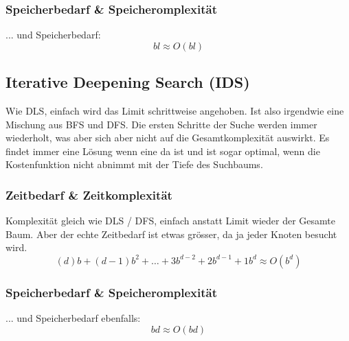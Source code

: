 \subsubsection{Speicherbedarf \& Speicheromplexität}
... und Speicherbedarf:
\begin{displaymath}
bl \approx O(bl)
\end{displaymath}

\subsection{Iterative Deepening Search (IDS)}
Wie DLS, einfach wird das Limit schrittweise angehoben. Ist also irgendwie eine Mischung aus BFS und DFS. Die ersten Schritte der Suche werden immer wiederholt, was aber sich aber nicht auf die Gesamtkomplexität auswirkt. Es findet immer eine Lösung wenn eine da ist und ist sogar optimal, wenn die Kostenfunktion nicht abnimmt mit der Tiefe des Suchbaums.

\subsubsection{Zeitbedarf \& Zeitkomplexität}
Komplexität gleich wie DLS / DFS, einfach anstatt Limit wieder der Gesamte Baum. Aber der echte Zeitbedarf ist etwas grösser, da ja jeder Knoten besucht wird.
\begin{displaymath}
	(d)b+(d-1)b^2+\dots +3b^{d-2}+2b^{d-1}+1b^{d} \approx O(b^d)
\end{displaymath}
\subsubsection{Speicherbedarf \& Speicheromplexität}
... und Speicherbedarf ebenfalls:
\begin{displaymath}
	bd \approx O(bd)
\end{displaymath}

